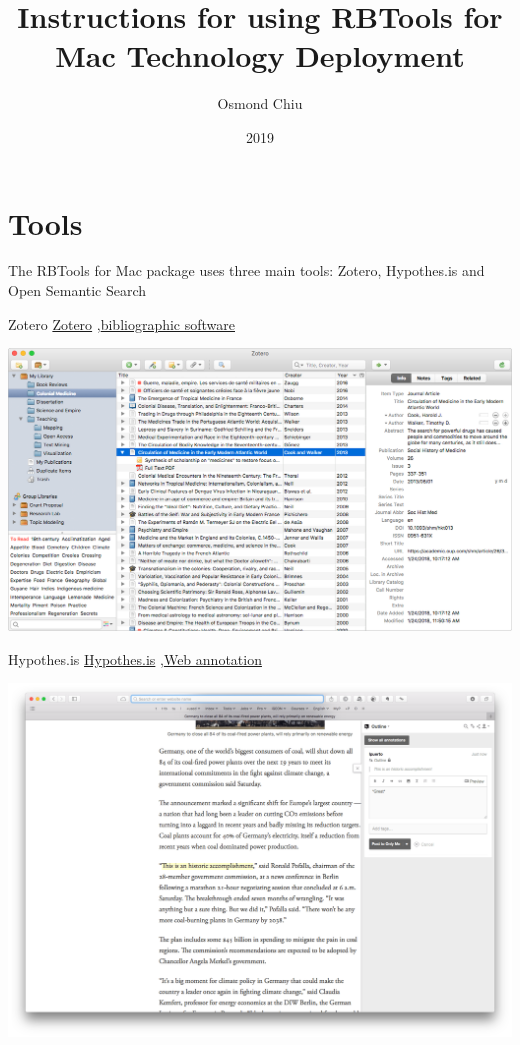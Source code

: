 \documentclass[10pt,a4paper]{article}
\title{Instructions for using RBTools for Mac Technology Deployment}
\author{Osmond Chiu}
\date{2019}
\begin{document}
\small

\maketitle
\thispagestyle{empty}
\scriptsize
\tableofcontents



\newpage

\section{Tools}

The RBTools for Mac package uses three main tools: Zotero, Hypothes.is and Open Semantic Search

\vspace{0.5cm}

\begin{textbox}{Zotero}
 \href{https://zotero.org}{Zotero} \sep \href{https://zotero.org}{bibliographic software}

\includegraphics[width=\textwidth]{zotero.png}
\end{textbox}

\begin{textbox}{Hypothes.is}
 \href{https://hypothes.is/}{Hypothes.is} \sep \href{https://hypothes.is/}{Web annotation}

\includegraphics[width=\textwidth]{Hypothesis.png}

\end{textbox}
\end{document}
